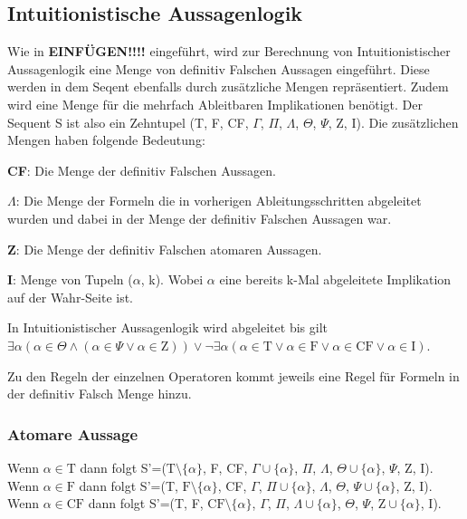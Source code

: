 \subsection{Intuitionistische Aussagenlogik}
Wie in \textbf{EINFÜGEN!!!!} eingeführt, wird zur Berechnung von Intuitionistischer Aussagenlogik eine Menge von definitiv Falschen Aussagen eingeführt. Diese werden in dem Seqent ebenfalls durch zusätzliche Mengen repräsentiert. Zudem wird eine Menge für die mehrfach Ableitbaren Implikationen benötigt. Der Sequent S ist also ein Zehntupel (T, F, CF, $\Gamma$, $\Pi$, $\Lambda$, $\Theta$, $\Psi$, Z, I). Die zusätzlichen Mengen haben folgende Bedeutung:

\begin{description}
\item \textbf{CF}: Die Menge der definitiv Falschen Aussagen.

\item \textbf{$\Lambda$}: Die Menge der Formeln die in vorherigen Ableitungsschritten abgeleitet wurden und dabei in der Menge der definitiv Falschen Aussagen war.

\item \textbf{Z}: Die Menge der definitiv Falschen atomaren Aussagen.

\item \textbf{I}: Menge von Tupeln ($\alpha$, k). Wobei $\alpha$ eine bereits k-Mal abgeleitete Implikation auf der Wahr-Seite ist.
\end{description}

In Intuitionistischer Aussagenlogik wird abgeleitet bis gilt $\exists\alpha(\alpha\in\Theta\wedge(\alpha\in\Psi\vee\alpha\in\textrm{Z}))\vee\neg\exists\alpha(\alpha\in\textrm{T}\vee\alpha\in\textrm{F}\vee\alpha\in\textrm{CF}\vee\alpha\in\textrm{I})$.

Zu den Regeln der einzelnen Operatoren kommt jeweils eine Regel für Formeln in der definitiv Falsch Menge hinzu.

\subsubsection{Atomare Aussage}
Wenn $\alpha\in\textrm{T}$ dann folgt S'=($\textrm{T}\setminus\lbrace\alpha\rbrace$, F, CF, $\Gamma\cup\lbrace\alpha\rbrace$, $\Pi$, $\Lambda$, $\Theta\cup\lbrace\alpha\rbrace$, $\Psi$, Z, I).\\
Wenn $\alpha\in\textrm{F}$ dann folgt S'=(T, $\textrm{F}\setminus\lbrace\alpha\rbrace$, CF, $\Gamma$, $\Pi\cup\lbrace\alpha\rbrace$, $\Lambda$, $\Theta$, $\Psi\cup\lbrace\alpha\rbrace$, Z, I).\\
Wenn $\alpha\in\textrm{CF}$ dann folgt S'=(T, F, $\textrm{CF}\setminus\lbrace\alpha\rbrace$, $\Gamma$, $\Pi$, $\Lambda\cup\lbrace\alpha\rbrace$, $\Theta$, $\Psi$, $\textrm{Z}\cup\lbrace\alpha\rbrace$, I).

